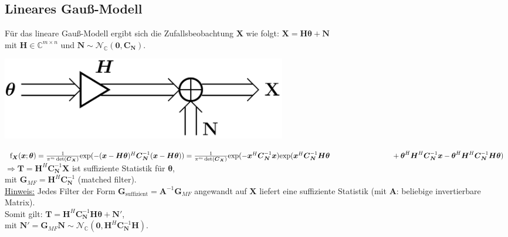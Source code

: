 \documentclass[a4paper,landscape,6pt]{article}
\newcommand{\ma}[1]{\ensuremath{\boldsymbol {#1}}}								%
\renewcommand{\vec}[1]{\ensuremath{\boldsymbol {#1}}}							%
\newcommand{\ul}[1]{\underline{#1}}
\begin{document}
\begin{multicols}{3}
\subsection*{Lineares Gauß-Modell}
Für das lineare Gauß-Modell ergibt sich die Zufallsbeobachtung $\vec X$ wie folgt: $\boxed{\vec X = \ma H \vec \theta + \vec N}$\\ mit $\ma H \in \mathbb{C}^{m \times n}$ und $\vec N \sim \mathcal{N}_{\mathbb{C}}(\vec 0, \ma C_{\vec N})$.

\begin{minipage}[h]{0.3\textwidth}
	\hspace{1 cm}
	\includegraphics[width=0.55\textwidth]{images_ssp/LinGauMod}\\
\end{minipage}

$\text{f}_{\vec X}(\vec x; \vec \theta) = \frac{1}{\pi^m \det(\ma C_{\vec X})} \text{exp}(-(\vec x - \ma H \vec \theta)^H \ma C_{\vec N}^{-1} (\vec x - \ma H \vec \theta))\\
= \frac{1}{\pi^m \det(\ma C_{\vec X})} \text{exp}(-\vec x ^H \ma C_{\vec N}^{-1} \vec x) \text{exp}(\vec x^H \ma C_{\vec N}^{-1}\ma H \vec \theta \\ \tab \tab \tab + \vec \theta^H \ma H ^H \ma C_{\vec N}^{-1} \vec x - \vec \theta^H \ma H^H \ma C_{\vec N}^{-1} \ma H \vec \theta)$\\

$\Rightarrow \vec T = \ma H^H \ma C_{\vec N}^{-1} \vec X$ ist suffiziente Statistik für $\vec \theta$,\\
mit $\boxed{\ma G_{MF} = \ma H^H \ma C_{\vec N}^{-1}}$ (matched filter).\\

\ul{Hinweis:} Jedes Filter der Form $\ma G_{\text{suffizient}} = \ma A^{-1} \ma G_{MF}$ angewandt auf $\vec X$ liefert eine suffiziente Statistik (mit $\ma A$: beliebige invertierbare Matrix).\\
Somit gilt: $\vec T =  \ma H^H \ma C_{\vec N}^{-1} \ma H \vec \theta + \vec N'$, \\ mit $\vec N' = \ma G_{MF} \vec N \sim \mathcal{N}_{\mathbb{C}}(\vec 0, \ma H^H \ma C_{\vec N}^{-1} \ma H)$. 

\end{multicols}
\end{document}
